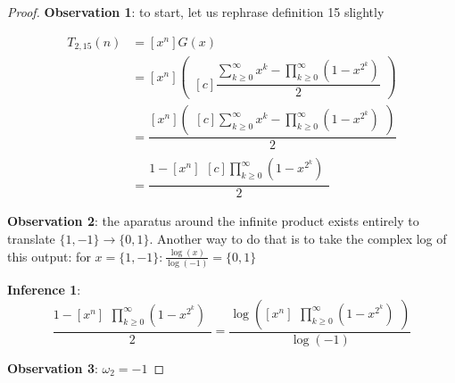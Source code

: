 \documentclass[conference]{IEEEtran}
\begin{document}
\begin{proof}
\textbf{Observation 1}: to start, let us rephrase definition 15 slightly

\begin{equation}
\begin{aligned}
T_{2,15}(n) &= [x^n]G(x) \\
    &= [x^n] \left(\begin{aligned}[c]
    \dfrac{\displaystyle\sum_{k\ge0}^\infty x^k - \prod_{k \ge 0}^\infty (1 - x^{2^k})}{2}
    \end{aligned}\right) \\
    &= \dfrac{[x^n] \left(\begin{aligned}[c]
    \displaystyle\sum_{k\ge0}^\infty x^k - \prod_{k \ge 0}^\infty (1 - x^{2^k})\end{aligned}\right)}{2}
     \\
    &= \dfrac{1 - [x^n]\begin{aligned}[c]
    \displaystyle\prod_{k \ge 0}^\infty (1 - x^{2^k})
    \end{aligned}
    }{2}
\end{aligned}
\end{equation}

\textbf{Observation 2}: the aparatus around the infinite product exists entirely to translate $\{1, -1\} \to \{0, 1\}$. Another way to do that is to take the complex log of this output: for $x = \{1, -1\}: \tfrac{\log(x)}{\log(-1)} = \{0, 1\}$

\textbf{Inference 1}: \begin{equation}
    \dfrac{1 - [x^n]\begin{aligned}
    \displaystyle\prod_{k \ge 0}^\infty (1 - x^{2^k})
    \end{aligned}
    }{2} = \dfrac{\log\left([x^n]\begin{aligned}
    \displaystyle\prod_{k \ge 0}^\infty (1 - x^{2^k})
    \end{aligned}\right)}{\log(-1)}
\end{equation}

\textbf{Observation 3}: $\omega_2 = -1$


\end{proof}
\end{document}
